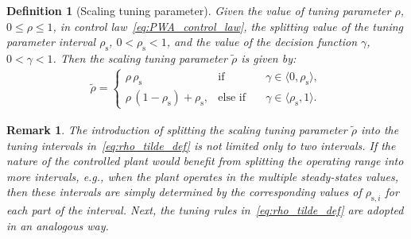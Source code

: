 \documentclass[preprint,12pt]{elsarticle}
\newtheorem{remark}[theorem]{Remark}
\newtheorem{definition}{Definition}[section]
\begin{document}
	\begin{definition}[Scaling tuning parameter]
		\label{def:rho_tilde}
		Given the value of tuning parameter $\rho$, $0 \leq \rho \leq 1$, in control law~\eqref{eq:PWA_control_law}, the splitting value of the tuning parameter interval $\rho_{\mathrm{s}}$, $0 < \rho_{\mathrm{s}} < 1$, and the value of the decision function $\gamma$, $0 < \gamma < 1$. Then the scaling tuning parameter $\widetilde{\rho}$ is given by:		
		\begin{eqnarray}
			\label{eq:rho_tilde_def}
			\widetilde{\rho} = \left\{ 
			\begin{matrix}
				\rho \, \rho_{\mathrm{s}} & \mathrm{if} & \quad \gamma \in \langle 0, \rho_{\mathrm{s}} \rangle , \\
				\rho \, (1-\rho_{\mathrm{s}}) + \rho_{\mathrm{s}}, & \mathrm{else}\,\,\mathrm{if} &\quad \gamma \in \langle \rho_{\mathrm{s}}, 1 \rangle.
			\end{matrix}
			\right.
		\end{eqnarray}
	\end{definition}
	
	
	
	\begin{remark}
		\label{rem:rho_tilde}		
		The introduction of splitting the scaling tuning parameter $\widetilde{\rho}$ into the tuning intervals in~\eqref{eq:rho_tilde_def} is not limited only to two intervals. If the nature of the controlled plant would benefit from splitting the operating range into more intervals, e.g., when the plant operates in the multiple steady-states values, then these intervals are simply determined by the corresponding values of $\rho_{\mathrm{s}, i}$ for each part of the interval. Next, the tuning rules in~\eqref{eq:rho_tilde_def} are adopted in an analogous way.
	\end{remark}
	
\end{document}
